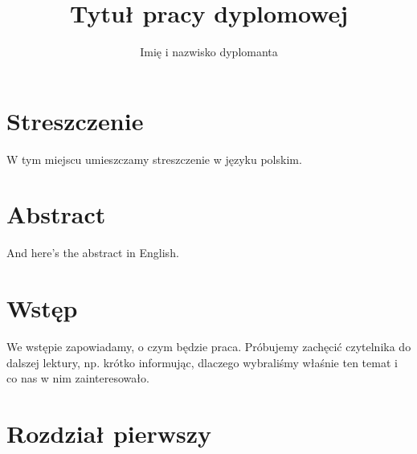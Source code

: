 \documentclass[polish,engineering]{wizthesis}
\author{Imię i nazwisko dyplomanta}
\title{Tytuł pracy dyplomowej}
\begin{document}
\frontmatter %


\maketitle

\chapter*{Streszczenie}

W tym miejscu umieszczamy streszczenie w języku polskim. \blindtext

{\let\clearpage\relax\chapter*{Abstract}} %

And here's the abstract in English. \blindtext


\tableofcontents


\chapter{Wstęp}

We wstępie zapowiadamy, o czym będzie praca. Próbujemy zachęcić czytelnika do dalszej lektury, np. krótko informując, dlaczego wybraliśmy właśnie ten temat i co nas w nim zainteresowało. \blindtext[2] \par \blindtext


\mainmatter %


\chapter{Rozdział pierwszy}
\end{document}
